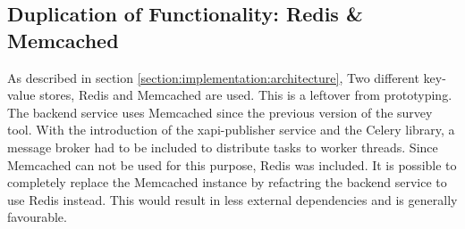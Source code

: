         \subsection{Duplication of Functionality: Redis \& Memcached}
        	As described in section \ref{section:implementation:architecture},
        	Two different key-value stores, Redis and Memcached are used.
        	This is a leftover from prototyping. The backend service
        	uses Memcached since the previous version of the survey tool.
        	With the introduction of the xapi-publisher service and
        	the Celery library, a message broker had to be included
        	to distribute tasks to worker threads. Since Memcached
        	can not be used for this purpose, Redis was included.
        	It is possible to completely replace the Memcached instance
        	by refactring the backend service to use Redis instead.
        	This would result in less external dependencies and
     		is generally favourable. 
